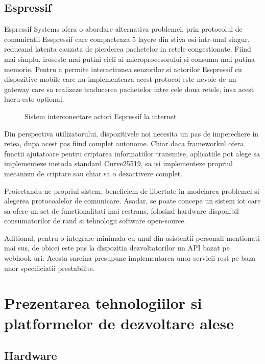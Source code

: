 \subsection {Espressif}

Espressif Systems ofera o abordare alternativa problemei, prin protocolul de comunicatii Esspressif care compacteaza 5 layere din stiva \acrfull{osi} intr-unul singur, reducand latenta cauzata de pierderea pachetelor in retele congestionate. Fiind mai simplu, iroseste mai putini cicli ai microprocesorului si consuma mai putina memorie. Pentru a permite interactiunea senzorilor si actorilor Esspressif cu dispozitive mobile care nu implementeaza acest protocol este nevoie de un gateway care sa realizeze traducerea pachetelor intre cele doua retele, insa acest lucru este optional.

\begin{figure}[h!]
  \centering
  \caption{Sistem interconectare actori Espressif la internet \cite{StackOverflow2021Espressif}}
\end{figure}

Din perspectiva utilizatorului, dispozitivele noi necesita un pas de imperechere in retea, dupa acest pas fiind complet autonome. Chiar daca frameworkul ofera functii ajutatoare pentru criptarea informatiilor transmise, aplicatiile pot alege sa implementeze metoda standard Curve25519, sa isi implementeze propriul mecanism de criptare sau chiar sa o dezactiveze complet.

Proiectandu-ne propriul sistem, beneficiem de libertate in modelarea problemei si alegerea protocoalelor de comunicare. Asadar, se poate concepe un sistem \acrshort{iot} care sa ofere un set de functionalitati mai restrans, folosind hardware disponibil consumatorilor de rand si tehnologii software open-source.

Aditional, pentru o integrare minimala cu unul din asistentii personali mentionati mai sus, de obicei este pus la dispozitia dezvoltatorilor un API bazat pe webhook-uri. Acesta sarcina presupune implementarea unor servicii \acrshort{rest} pe baza unor specificiatii prestabilite. 

\section {Prezentarea tehnologiilor si platformelor de dezvoltare alese}

\subsection {Hardware}

